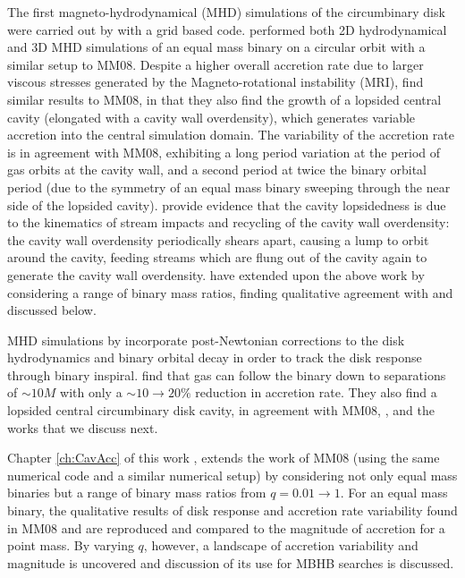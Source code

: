 The first magneto-hydrodynamical (MHD) simulations of the circumbinary disk
were carried out by \cite{ShiKrolik:2012} with a grid based code.
\cite{ShiKrolik:2012}  performed both 2D hydrodynamical and 3D MHD simulations
of an equal mass binary on a circular orbit with a similar setup to
MM08. Despite a higher overall accretion rate due to larger
viscous stresses generated by the Magneto-rotational instability (MRI),
\cite{ShiKrolik:2012} find similar results to MM08, in that they also find the
growth of a lopsided central cavity (elongated with a cavity wall
overdensity), which generates variable accretion into the central simulation
domain. The variability of the accretion rate is in agreement with MM08,
exhibiting a long period variation at the period of gas orbits at the cavity
wall, and a second period at twice the binary orbital period (due to the
symmetry of an equal mass binary sweeping through the near side of the lopsided
cavity). \cite{ShiKrolik:2012} provide evidence that the cavity lopsidedness is
due to the kinematics of stream impacts and recycling of the cavity wall
overdensity: the cavity wall overdensity periodically shears apart, causing a
lump to orbit around the cavity, feeding streams which are flung out of the
cavity again to generate the cavity wall overdensity. \cite{ShiKrolik:2015}
have extended upon the above work by considering a range of binary mass ratios,
finding qualitative agreement with \cite{DHM:2013:MNRAS} and \cite{Farris:2014}
discussed below.

MHD simulations by \cite{Noble+2012} incorporate post-Newtonian corrections
to the disk hydrodynamics and binary orbital decay in order to track the disk
response through binary inspiral. \cite{Noble+2012} find that gas can follow
the binary down to separations of $\sim10M$ with only a $\sim10 \rightarrow 20\%$
reduction in accretion rate. They also find a lopsided central circumbinary
disk cavity, in agreement with MM08, \cite{ShiKrolik:2012}, and the works
that we discuss next.

Chapter \ref{ch:CavAcc} of this work \citep{DHM:2013:MNRAS}, extends the work
of MM08 (using the same numerical code and a similar numerical setup) by
considering not only equal mass binaries but a range of binary mass ratios
from $q=0.01 \rightarrow 1$. For an equal mass binary, the qualitative results
of disk response and accretion rate variability found in MM08 and
\citep{ShiKrolik:2012} are reproduced and compared to the magnitude of
accretion for a point mass. By varying $q$, however, a landscape of accretion
variability and magnitude is uncovered and discussion of its use for MBHB
searches is discussed.

